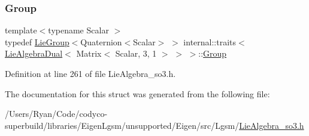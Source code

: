 \subsubsection{\texorpdfstring{Group}{Group}}
{\footnotesize\ttfamily template$<$typename Scalar $>$ \\
typedef \hyperlink{class_lie_group}{Lie\+Group}$<$Quaternion$<$Scalar$>$ $>$ internal\+::traits$<$ \hyperlink{class_lie_algebra_dual}{Lie\+Algebra\+Dual}$<$ Matrix$<$ Scalar, 3, 1 $>$ $>$ $>$\+::\hyperlink{structinternal_1_1traits_3_01_lie_algebra_dual_3_01_matrix_3_01_scalar_00_013_00_011_01_4_01_4_01_4_a05cfaae13397aaf0d8ece656959c0bfb}{Group}}



Definition at line 261 of file Lie\+Algebra\+\_\+so3.\+h.



The documentation for this struct was generated from the following file\+:\begin{DoxyCompactItemize}
\item 
/\+Users/\+Ryan/\+Code/codyco-\/superbuild/libraries/\+Eigen\+Lgsm/unsupported/\+Eigen/src/\+Lgsm/\hyperlink{_lie_algebra__so3_8h}{Lie\+Algebra\+\_\+so3.\+h}\end{DoxyCompactItemize}
